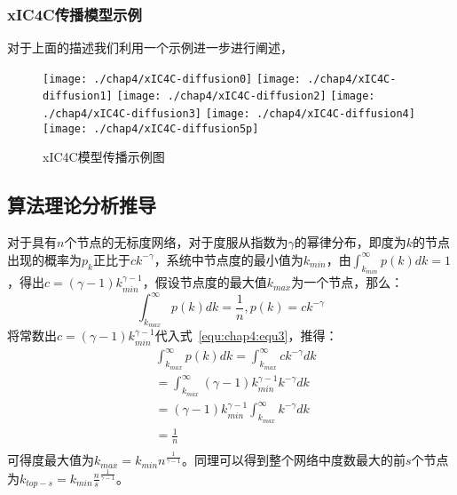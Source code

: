 \subsubsection{xIC4C传播模型示例}
对于上面的描述我们利用一个示例进一步进行阐述，

\begin{figure}[H]
	\centering%
	{\texttt{[image: ./chap4/xIC4C-diffusion0]}}
	\hspace{3em}%
	{\texttt{[image: ./chap4/xIC4C-diffusion1]}}
	\hspace{3em}%
	{\texttt{[image: ./chap4/xIC4C-diffusion2]}}
	\hspace{3em}%
	{\texttt{[image: ./chap4/xIC4C-diffusion3]}}
	\hspace{3em}%
	{\texttt{[image: ./chap4/xIC4C-diffusion4]}}
	\hspace{3em}%
	{\texttt{[image: ./chap4/xIC4C-diffusion5p]}}
	\caption{xIC4C模型传播示例图}
	\label{fig:chap4:xcic-demo}
\end{figure}


\subsection{算法理论分析推导}
对于具有$n$个节点的无标度网络，对于度服从指数为$\gamma$的幂律分布，即度为$k$的节点出现的概率为$p_k$正比于$ck^{-\gamma}$，系统中节点度的最小值为$k_{min}$，由$\int_{k_{min}}^{\infty}p(k)dk=1$，得出$c=(\gamma -1)k_{min}^{\gamma -1}$，假设节点度的最大值$k_{max}$为一个节点，那么：
\begin{equation}
\label{equ:chap4:equ3}
\int_{k_{max}}^{\infty}p(k)dk=\frac{1}{n},p(k)=ck^{-\gamma}
\end{equation}
将常数出$c=(\gamma -1)k_{min}^{\gamma -1}$代入式~\ref{equ:chap4:equ3}，推得：
\begin{equation}
\label{equ:chap4:equ4}
	\begin{split}
	& \int_{k_{max}}^{\infty}p(k)dk=\int_{k_{max}}^{\infty}ck^{-\gamma}dk \\
	& =\int_{k_{max}}^{\infty}(\gamma -1)k_{min}^{\gamma -1}k^{-\gamma}dk \\
	& =(\gamma -1)k_{min}^{\gamma -1}\int_{k_{max}}^{\infty}k^{-\gamma}dk \\
	& =\frac{1}{n} \\
	\end{split}
\end{equation}
可得度最大值为$k_{max}=k_{min}n^{\frac{1}{\gamma -1}}$。同理可以得到整个网络中度数最大的前$s$个节点为$k_{top-s}=k_{min}\frac{n}{s}^{\frac{1}{\gamma -1}}$。
